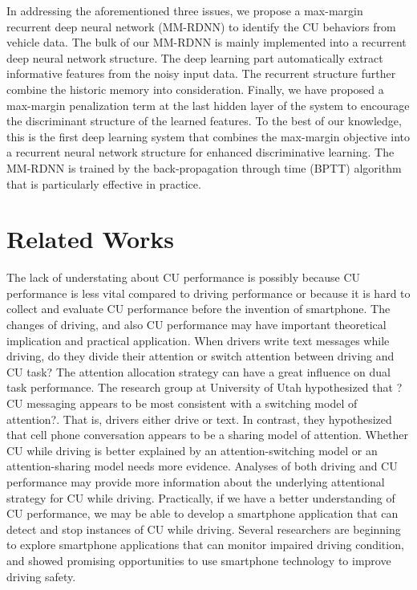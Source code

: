 \documentclass[journal]{IEEEtran}
\begin{document}
In addressing the aforementioned three issues,  we propose a max-margin recurrent deep neural network (MM-RDNN) to identify the CU behaviors from vehicle data. The bulk of our MM-RDNN is mainly implemented into a recurrent deep neural network structure. The deep learning part automatically   extract informative features from the noisy input data. The recurrent structure further combine the historic memory into consideration. Finally, we have proposed a max-margin penalization term at the last hidden layer of the system to encourage the discriminant structure of the learned features. To the best of our knowledge, this is the first deep learning system that combines the max-margin objective into a recurrent  neural network structure for enhanced discriminative learning.  The MM-RDNN is trained by the back-propagation through time (BPTT) algorithm that is particularly effective in practice.

 
 



\section{Related Works}

The lack of understating about CU performance is possibly because CU performance is less vital compared to driving performance or because it is hard to collect and evaluate CU performance before the invention of smartphone. The changes of driving, and also CU performance may have important theoretical implication and practical application.  When drivers write text messages while driving, do they divide their attention or switch attention between driving and CU task? The attention allocation strategy can have a great influence on dual task performance. The research group at University of Utah hypothesized that ?CU messaging appears to be most consistent with a switching model of attention?. That is, drivers either drive or text. In contrast, they hypothesized that cell phone conversation appears to be a sharing model of attention. Whether CU while driving is better explained by an attention-switching model or an attention-sharing model needs more evidence. Analyses of both driving and CU performance may provide more information about the underlying attentional strategy for CU while driving. Practically, if we have a better understanding of CU performance, we may be able to develop a smartphone application that can detect and stop instances of CU while driving. Several researchers are beginning to explore smartphone applications that can monitor impaired driving condition, and showed promising opportunities to use smartphone technology to improve driving safety.
\end{document}
